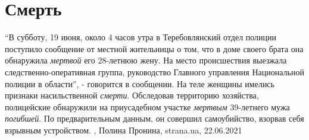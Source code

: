  
 
 
 
 
\chapter{Смерть}

\enquote{В субботу, 19 июня, около 4 часов утра в Теребовлянский отдел полиции
поступило сообщение от местной жительницы о том, что в доме своего брата она
обнаружила \emph{мертвой} его 28-летнюю жену. На место происшествия выезжала
следственно-оперативная группа, руководство Главного управления Национальной
полиции в области}, - говорится в сообщении.  На теле женщины имелись признаки
насильственной \emph{смерти}. Обследовав территорию хозяйства, полицейские обнаружили
на приусадебном участке \emph{мертвым} 39-летнего мужа \emph{погибшей}. По предварительным
данным, он совершил самоубийство, взорвав себя взрывным устройством.
  , Полина Пронина, strana.ua, 22.06.2021
